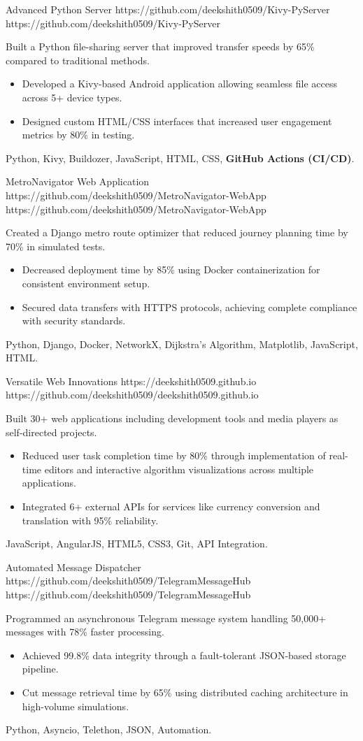 \documentclass[a4paper,10pt]{article}
\begin{document}
\vspace{5pt}
\projectentry
    {Advanced Python Server}
    {https://github.com/deekshith0509/Kivy-PyServer}
    {https://github.com/deekshith0509/Kivy-PyServer} 
    {Built a Python file-sharing server that improved transfer speeds by 65\% compared to traditional methods.
    \begin{itemize}
        \item Developed a Kivy-based Android application allowing seamless file access across 5+ device types.
        \item Designed custom HTML/CSS interfaces that increased user engagement metrics by 80\% in testing.
    \end{itemize}}{Python, Kivy, Buildozer, JavaScript, HTML, CSS, \textbf{GitHub Actions (CI/CD)}.}

\projectentry
{MetroNavigator Web Application}
{https://github.com/deekshith0509/MetroNavigator-WebApp}
{https://github.com/deekshith0509/MetroNavigator-WebApp}
{Created a Django metro route optimizer that reduced journey planning time by 70\% in simulated tests.
\begin{itemize}
    \item Decreased deployment time by 85\% using Docker containerization for consistent environment setup.
    \item Secured data transfers with HTTPS protocols, achieving complete compliance with security standards.
\end{itemize}  
}{Python, Django, Docker, NetworkX, Dijkstra’s Algorithm, Matplotlib, JavaScript, HTML.}

\projectentry
{Versatile Web Innovations}
{https://deekshith0509.github.io}
{https://github.com/deekshith0509/deekshith0509.github.io}
{Built 30+ web applications including development tools and media players as self-directed projects.
\begin{itemize}
    \item Reduced user task completion time by 80\% through implementation of real-time editors and interactive algorithm visualizations across multiple applications.
    \item Integrated 6+ external APIs for services like currency conversion and translation with 95\% reliability.
\end{itemize}  
}{JavaScript, AngularJS, HTML5, CSS3, Git, API Integration.}


\projectentry
{Automated Message Dispatcher}
{https://github.com/deekshith0509/TelegramMessageHub}
{https://github.com/deekshith0509/TelegramMessageHub}
{Programmed an asynchronous Telegram message system handling 50,000+ messages with 78\% faster processing. 
\begin{itemize}
    \item Achieved 99.8\% data integrity through a fault-tolerant JSON-based storage pipeline.
    \item Cut message retrieval time by 65\% using distributed caching architecture in high-volume simulations.
\end{itemize}  
}{Python, Asyncio, Telethon, JSON, Automation.}
\end{document}
